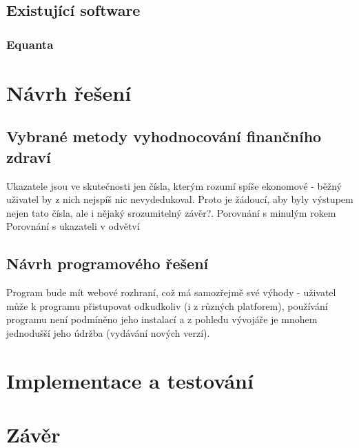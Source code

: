 \section{Existující software}
\subsection{Equanta\sffamily\textregistered}

\chapter{Návrh řešení}
\section{Vybrané metody vyhodnocování finančního zdraví}
Ukazatele jsou ve skutečnosti jen čísla, kterým rozumí spíše ekonomové - běžný uživatel by z nich nejspíš nic nevydedukoval. Proto je žádoucí, aby byly výstupem nejen tato čísla, ale i nějaký srozumitelný závěr?.
Porovnání s minulým rokem
Porovnání s ukazateli v odvětví

\section{Návrh programového řešení}
Program bude mít webové rozhraní, což má samozřejmě své výhody - uživatel může k programu přistupovat odkudkoliv (i z různých platforem), používání programu není podmíněno jeho instalací a z pohledu vývojáře je mnohem jednodušší jeho údržba (vydávání nových verzí).

\chapter{Implementace a testování}
\chapter{Závěr}
